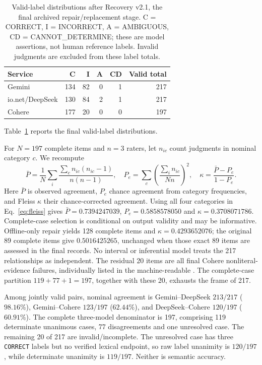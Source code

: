 \begin{table}[htbp]\centering\small
\caption{Valid-label distributions after Recovery v2.1, the final archived repair/replacement stage. C = CORRECT, I = INCORRECT, A = AMBIGUOUS, CD = CANNOT\_DETERMINE; these are model assertions, not human reference labels. Invalid judgments are excluded from these label totals.}\label{tab:relationship-labels}
\begin{tabular}{@{}lrrrrr@{}}\toprule
Service & C & I & A & CD & Valid total\\\midrule
Gemini & 134 & 82 & 0 & 1 & 217\\
io.net/DeepSeek & 130 & 84 & 2 & 1 & 217\\
Cohere & 177 & 20 & 0 & 0 & 197\\\bottomrule
\end{tabular}\end{table}

Table~\ref{tab:relationship-labels} reports the final valid-label distributions.

For $N=197$ complete items and $n=3$ raters, let $n_{ic}$ count judgments in nominal category $c$. We recompute
\begin{equation}
\bar P=\frac{1}{N}\sum_i\frac{\sum_c n_{ic}(n_{ic}-1)}{n(n-1)},\quad
P_e=\sum_c\left(\frac{\sum_i n_{ic}}{Nn}\right)^2,\quad
\kappa=\frac{\bar P-P_e}{1-P_e}.
\label{eq:fleiss}
\end{equation}
Here $\bar P$ is observed agreement, $P_e$ chance agreement from category frequencies, and Fleiss\textquotesingle{} $\kappa$ their chance-corrected agreement. Using all four categories in Eq.~\eqref{eq:fleiss} gives $\bar P=0.7394247039$, $P_e=0.5858578050$ and $\kappa=0.3708071786$. Complete-case selection is conditional on output validity and may be informative. Offline-only repair yields 128 complete items and $\kappa=0.4293652076$; the original 89 complete items give $0.5016425265$, unchanged when those exact 89 items are assessed in the final records. No interval or inferential model treats the 217 relationships as independent. The residual 20 items are all final Cohere nonliteral-evidence failures, individually listed in the machine-readable . The complete-case partition $119+77+1=197$, together with these 20, exhausts the frame of 217.

Among jointly valid pairs, nominal agreement is Gemini--DeepSeek $213/217$ ($98.16\%$), Gemini--Cohere $123/197$ ($62.44\%$), and DeepSeek--Cohere $120/197$ ($60.91\%$). The complete three-model denominator is 197, comprising 119 determinate unanimous cases, 77 disagreements and one unresolved case. The remaining 20 of 217 are invalid/incomplete. The unresolved case has three \texttt{CORRECT} labels but no verified lexical endpoint, so raw label unanimity is $120/197$, while determinate unanimity is $119/197$. Neither is semantic accuracy.

